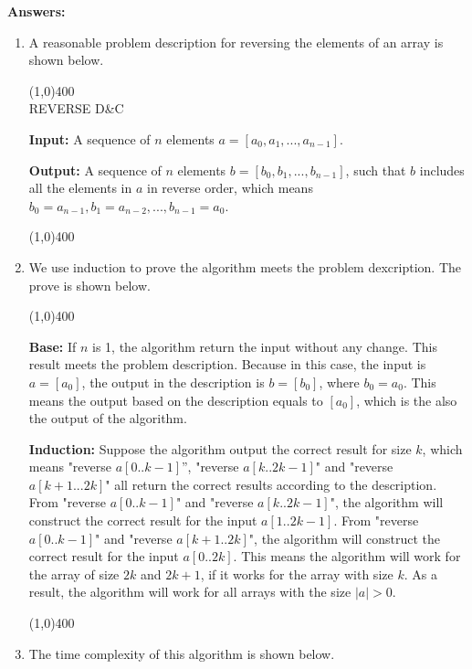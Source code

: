 \documentclass[11pt,letterpaper,oneside]{article}
\begin{document}
\noindent\textbf{Answers:}
\begin{enumerate}
\item A reasonable problem description for reversing the elements of an array is shown below.

\line(1,0){400}\\
    REVERSE D\&C

    \textbf{Input:} A sequence of $n$ elements $a = [a_{0}, a_{1}, ..., a_{n-1}]$.

    \textbf{Output:} A sequence of $n$ elements $b = [b_{0}, b_{1}, ..., b_{n-1}]$, such that $b$ includes all the elements in $a$ in reverse order, which means $b_{0}=a_{n-1}, b_{1}=a_{n-2}, ..., b_{n-1}=a_{0}$.

\vspace{-1em}\line(1,0){400}
\item We use induction to prove the algorithm meets the problem dexcription. The prove is shown below.

\line(1,0){400}

    \textbf{Base:} If $n$ is 1, the algorithm return the input without any change. This result meets the problem description. Because in this case, the input is $a = [a_{0}]$, the output in the description is $b = [b_{0}]$, where $b_{0}=a_{0}$. This means the output based on the description equals to $[a_{0}]$, which is the also the output of the algorithm.

    \textbf{Induction:} Suppose the algorithm output the correct result for size $k$, which means "reverse $a[0..k-1]$'', "reverse $a[k..2k-1]$" and "reverse $a[k+1...2k]$" all return the correct results according to the description. From "reverse $a[0..k-1]$" and "reverse $a[k..2k-1]$", the algorithm will construct the correct result for the input $a[1..2k-1]$. From "reverse $a[0..k-1]$" and "reverse $a[k+1..2k]$", the algorithm will construct the correct result for the input $a[0..2k]$. This means the algorithm will work for the array of size $2k$ and $2k+1$, if it works for the array with size $k$. As a result, the algorithm will work for all arrays with the size $|a|>0$.

\vspace{-1em}\line(1,0){400}

\item The time complexity of this algorithm is shown below.
  

\end{enumerate}
\end{document}
